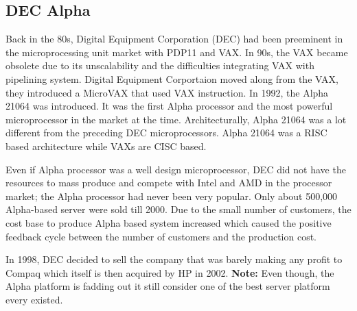 \documentclass[letterpaper,10pt,titlepage]{article}
\begin{document}
\subsection{DEC Alpha}
\indent Back in the 80s, Digital Equipment Corporation (DEC) had been preeminent
in the microprocessing unit market with PDP11 and VAX.  In 90s, the VAX
became obsolete due to its unscalability and the difficulties 
integrating VAX with pipelining system. Digital Equipment Corportaion 
moved along from the VAX, they introduced a MicroVAX that used VAX 
instruction. In 1992, the Alpha 21064 was introduced. It was the first 
Alpha processor and the most powerful microprocessor in the market at the
time. Architecturally, Alpha 21064 was a lot different from the preceding 
DEC microprocessors. Alpha 21064 was a RISC based architecture while VAXs
are CISC based. 
\par
Even if Alpha processor was a well design microprocessor, DEC did not 
have the resources to mass produce and compete with Intel and AMD in the 
processor market; the Alpha processor had never been very popular. Only
about 500,000 Alpha-based server were sold till 2000. Due to the small 
number of customers, the cost base to produce Alpha based system increased
which caused the positive feedback cycle between the number of customers 
and the production cost.
\par
In 1998, DEC decided to sell the company that was barely making any profit 
to Compaq which itself is then acquired by HP in 2002. 
\textbf{Note:} Even though, the Alpha platform is fadding out it still 
consider one of the best server platform every existed. 
\end{document}
